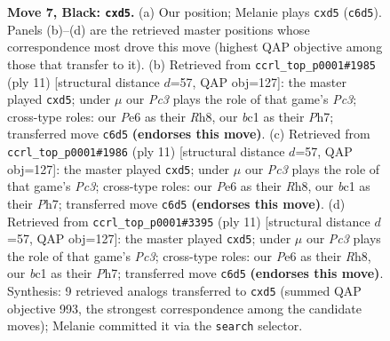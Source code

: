 \documentclass[11pt]{article}
\begin{document}
\begin{figure}[p]
\caption{\textbf{Move 7, Black: \texttt{cxd5}.} (a) Our position; Melanie plays \texttt{cxd5} (\texttt{c6d5}). Panels (b)--(d) are the retrieved master positions whose correspondence most drove this move (highest QAP objective among those that transfer to it). (b) Retrieved from \texttt{ccrl\_top\_p0001\#1985} (ply 11) [structural distance $d$=57, QAP obj=127]: the master played \texttt{cxd5}; under $\mu$ our \emph{Pc3} plays the role of that game's \emph{Pc3}; cross-type roles: our \emph{P}e6 as their \emph{R}h8, our \emph{b}c1 as their \emph{P}h7; transferred move \texttt{c6d5} \textbf{(endorses this move)}. (c) Retrieved from \texttt{ccrl\_top\_p0001\#1986} (ply 11) [structural distance $d$=57, QAP obj=127]: the master played \texttt{cxd5}; under $\mu$ our \emph{Pc3} plays the role of that game's \emph{Pc3}; cross-type roles: our \emph{P}e6 as their \emph{R}h8, our \emph{b}c1 as their \emph{P}h7; transferred move \texttt{c6d5} \textbf{(endorses this move)}. (d) Retrieved from \texttt{ccrl\_top\_p0001\#3395} (ply 11) [structural distance $d$=57, QAP obj=127]: the master played \texttt{cxd5}; under $\mu$ our \emph{Pc3} plays the role of that game's \emph{Pc3}; cross-type roles: our \emph{P}e6 as their \emph{R}h8, our \emph{b}c1 as their \emph{P}h7; transferred move \texttt{c6d5} \textbf{(endorses this move)}. Synthesis: 9 retrieved analogs transferred to \texttt{cxd5} (summed QAP objective 993, the strongest correspondence among the candidate moves); Melanie committed it via the \texttt{search} selector.}
\label{fig:thought-m13}
\end{figure}

\clearpage
\end{document}
